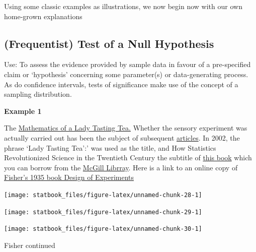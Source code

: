 \documentclass[]{book}
\begin{document}
Using some classic examples as illustrations, we now begin now with our own home-grown explanations

\hypertarget{frequentist-test-of-a-null-hypothesis}{%
\subsection{(Frequentist) Test of a Null Hypothesis}\label{frequentist-test-of-a-null-hypothesis}}

Use: To assess the evidence provided by sample data in favour of a pre-specified claim or `hypothesis' concerning some parameter(s) or data-generating process. As do confidence intervals, tests of significance make use of the concept of a sampling distribution.

\textbf{Example 1}

The \href{http://www.medicine.mcgill.ca/epidemiology/hanley/c607/ch06/lady_tasting_tea.pdf}{Mathematics of a Lady Tasting Tea.} Whether the sensory experiment was actually carried out has been the subject of subsequent \href{https://rss.onlinelibrary.wiley.com/doi/full/10.1111/j.1740-9713.2012.00620.x}{articles}. In 2002, the phrase `Lady Tasting Tea':' was used as the title, and How Statistics Revolutionized Science in the Twentieth Century the subtitle of \href{https://www.amazon.ca/Lady-Tasting-Tea-Statistics-Revolutionized/dp/0805071342}{this book} which you can borrow from the \href{https://mcgill.overdrive.com/media/E974A53B-3700-474A-9E11-9E8758435E70}{McGill Librray}.
Here is a link to an online copy of \href{https://www.phil.vt.edu/dmayo/PhilStatistics/b\%20Fisher\%20design\%20of\%20experiments.pdf}{Fisher's 1935 book Design of Experiments}

\begin{center}\texttt{[image: statbook\_files/figure-latex/unnamed-chunk-28-1]} \end{center}

\begin{center}\texttt{[image: statbook\_files/figure-latex/unnamed-chunk-29-1]} \end{center}

\begin{center}\texttt{[image: statbook\_files/figure-latex/unnamed-chunk-30-1]} \end{center}

Fisher continued
\end{document}
